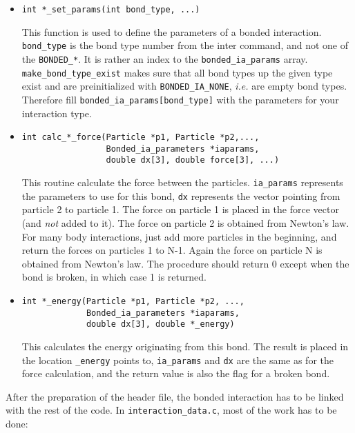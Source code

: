 \documentclass[
a4paper,                        %
11pt,                           %
twoside,                        %
footsepline,                    %
headsepline,                    %
headexclude,                    %
footexclude,                    %
pagesize,                       %
bibtotocnumbered,               %
idxtotoc                        %
]{scrreprt}
\newcommand{\ie}{\textit{i.e.}\xspace}
\begin{document}
\begin{itemize}
\item 
\begin{verbatim}
int *_set_params(int bond_type, ...)
\end{verbatim}
  This function is used to define the parameters of a bonded
  interaction. \verb!bond_type! is the bond type number from the inter
  command, and not one of the \verb!BONDED_*!. It is rather an index
  to the \verb!bonded_ia_params! array. \verb!make_bond_type_exist!
  makes sure that all bond types up the given type exist and are
  preinitialized with \verb!BONDED_IA_NONE!, \ie are empty bond
  types. Therefore fill \verb!bonded_ia_params[bond_type]! with the
  parameters for your interaction type.
\item
\begin{verbatim}
int calc_*_force(Particle *p1, Particle *p2,..., 
                 Bonded_ia_parameters *iaparams, 
                 double dx[3], double force[3], ...)
\end{verbatim}
  This routine calculate the force between the
  particles. \verb!ia_params!  represents the parameters to use for
  this bond, \verb!dx! represents the vector pointing from particle 2
  to particle 1.  The force on particle 1 is placed in the force
  vector (and \emph{not} added to it). The force on particle 2 is
  obtained from Newton's law. For many body interactions, just add
  more particles in the beginning, and return the forces on particles
  1 to N-1. Again the force on particle N is obtained from Newton's
  law. The procedure should return 0 except when the bond is broken,
  in which case 1 is returned.

\item 
\begin{verbatim}
int *_energy(Particle *p1, Particle *p2, ..., 
             Bonded_ia_parameters *iaparams, 
             double dx[3], double *_energy)
\end{verbatim}
  This calculates the energy originating from this bond. The result is
  placed in the location \verb!_energy! points to, \verb!ia_params!
  and \verb!dx! are the same as for the force calculation, and the
  return value is also the flag for a broken bond.
\end{itemize}

After the preparation of the header file, the bonded interaction has
to be linked with the rest of the code. In
\verb!interaction_data.c!, most of the work has to be done:
\end{document}

